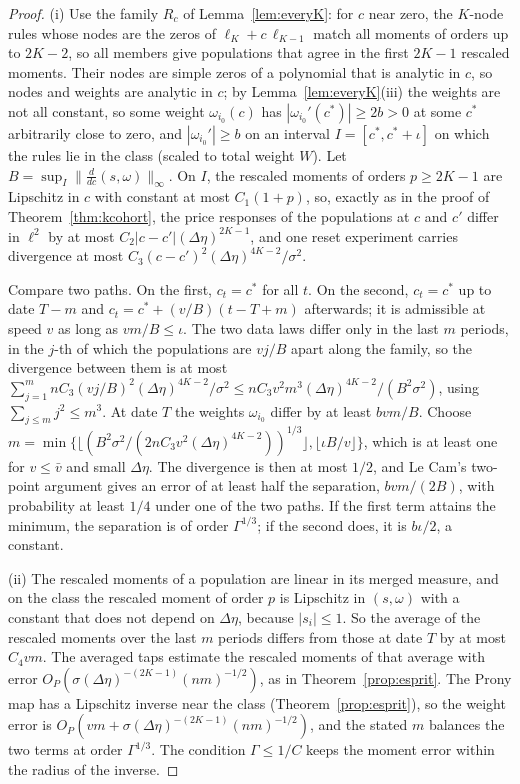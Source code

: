 \begin{proof}
(i) Use the family $R_c$ of Lemma~\ref{lem:everyK}: for $c$ near zero, the $K$-node rules whose nodes are the zeros of $\ell_K+c\,\ell_{K-1}$ match all moments of orders up to $2K-2$, so all members give populations that agree in the first $2K-1$ rescaled moments. Their nodes are simple zeros of a polynomial that is analytic in $c$, so nodes and weights are analytic in $c$; by Lemma~\ref{lem:everyK}(iii) the weights are not all constant, so some weight $\omega_{i_0}(c)$ has $|\omega_{i_0}'(c^*)|\ge2b>0$ at some $c^*$ arbitrarily close to zero, and $|\omega_{i_0}'|\ge b$ on an interval $I=[c^*,c^*+\iota]$ on which the rules lie in the class (scaled to total weight $W$). Let $B=\sup_I\|\tfrac{d}{dc}(s,\omega)\|_\infty$. On $I$, the rescaled moments of orders $p\ge2K-1$ are Lipschitz in $c$ with constant at most $C_1(1+p)$, so, exactly as in the proof of Theorem~\ref{thm:kcohort}, the price responses of the populations at $c$ and $c'$ differ in $\ell^2$ by at most $C_2|c-c'|(\Delta\eta)^{2K-1}$, and one reset experiment carries divergence at most $C_3(c-c')^2(\Delta\eta)^{4K-2}/\sigma^2$.

Compare two paths. On the first, $c_t=c^*$ for all $t$. On the second, $c_t=c^*$ up to date $T-m$ and $c_t=c^*+(v/B)(t-T+m)$ afterwards; it is admissible at speed $v$ as long as $vm/B\le\iota$. The two data laws differ only in the last $m$ periods, in the $j$-th of which the populations are $vj/B$ apart along the family, so the divergence between them is at most $\sum_{j=1}^mnC_3(vj/B)^2(\Delta\eta)^{4K-2}/\sigma^2\le nC_3v^2m^3(\Delta\eta)^{4K-2}/(B^2\sigma^2)$, using $\sum_{j\le m}j^2\le m^3$. At date $T$ the weights $\omega_{i_0}$ differ by at least $bvm/B$. Choose $m=\min\{\lfloor(B^2\sigma^2/(2nC_3v^2(\Delta\eta)^{4K-2}))^{1/3}\rfloor,\lfloor\iota B/v\rfloor\}$, which is at least one for $v\le\bar v$ and small $\Delta\eta$. The divergence is then at most $1/2$, and Le Cam's two-point argument gives an error of at least half the separation, $bvm/(2B)$, with probability at least $1/4$ under one of the two paths. If the first term attains the minimum, the separation is of order $\Gamma^{1/3}$; if the second does, it is $b\iota/2$, a constant.

(ii) The rescaled moments of a population are linear in its merged measure, and on the class the rescaled moment of order $p$ is Lipschitz in $(s,\omega)$ with a constant that does not depend on $\Delta\eta$, because $|s_i|\le1$. So the average of the rescaled moments over the last $m$ periods differs from those at date $T$ by at most $C_4vm$. The averaged taps estimate the rescaled moments of that average with error $O_P(\sigma(\Delta\eta)^{-(2K-1)}(nm)^{-1/2})$, as in Theorem~\ref{prop:esprit}. The Prony map has a Lipschitz inverse near the class (Theorem~\ref{prop:esprit}), so the weight error is $O_P(vm+\sigma(\Delta\eta)^{-(2K-1)}(nm)^{-1/2})$, and the stated $m$ balances the two terms at order $\Gamma^{1/3}$. The condition $\Gamma\le1/C$ keeps the moment error within the radius of the inverse.


\end{proof}
